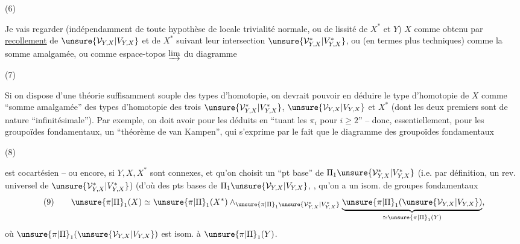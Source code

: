 (6)

Je vais regarder (indépendamment de toute hypothèse de locale trivialité normale, ou de lissité de $X^*$ et $Y$) $X$ comme obtenu par \uline{recollement} de $\unsure{\mathcal V_{Y,X}|V_{Y,X}}$ et de $X^*$ suivant leur intersection $\unsure{\mathcal V_{Y,X}^*|V_{Y,X}^*}$, ou (en termes plus techniques) comme la somme amalgamée, ou comme  espace-topos $\varinjlim$ du diagramme

(7)


Si on dispose d'une théorie suffisamment souple des types d'homotopie, on devrait pouvoir en déduire le type d'homotopie de $X$ comme ``somme amalgamée'' des types d'homotopie des trois  $\unsure{\mathcal V_{Y,X}^*|V_{Y,X}^*}$, $\unsure{\mathcal V_{Y,X}|V_{Y,X}}$ et $X^*$ (dont les deux premiers sont de nature ``infinitésimale''). Par exemple, on doit avoir pour les  déduits en ``tuant les $\pi_i$ pour $i\geq2$'' -- donc, essentiellement, pour les groupoïdes fondamentaux, un ``théorème de van Kampen'', qui s'exprime par le fait que le diagramme des groupoïdes fondamentaux

(8)


est cocartésien -- ou encore, si $Y,X,X^*$ sont connexes, et qu'on choisit un ``pt base'' de $\Pi_1\unsure{\mathcal V_{Y,X}^*|V_{Y,X}^*}$ (i.e. par définition, un rev. universel de $\unsure{\mathcal V_{Y,X}^*|V_{Y,X}^*}$) (d'où des pts bases de $\Pi_1\unsure{\mathcal V_{Y,X}|V_{Y,X}}$, , qu'on a un isom.  de groupes fondamentaux
\[
(9)\qquad \unsure{\pi|\Pi}_1(X)\simeq\unsure{\pi|\Pi}_1(X^*)\wedge_{\unsure{\pi|\Pi}_1\unsure{\mathcal V_{Y,X}^*|V_{Y,X}^*}}\underbrace{\unsure{\pi|\Pi}_1(\unsure{\mathcal V_{Y,X}|V_{Y,X}})}_{\simeq\unsure{\pi|\Pi}_1(Y)},
\]
où $\unsure{\pi|\Pi}_1(\unsure{\mathcal V_{Y,X}|V_{Y,X}})$ est isom.  à $\unsure{\pi|\Pi}_1(Y)$.

